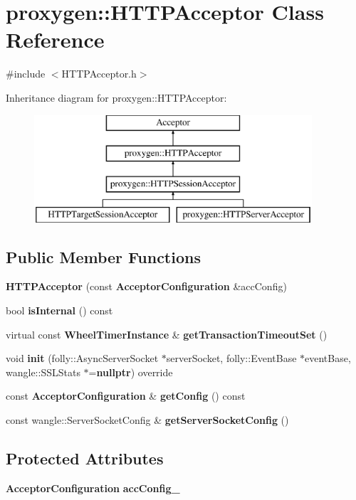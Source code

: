 \section{proxygen\+:\+:H\+T\+T\+P\+Acceptor Class Reference}
\label{classproxygen_1_1HTTPAcceptor}


{\ttfamily \#include $<$H\+T\+T\+P\+Acceptor.\+h$>$}

Inheritance diagram for proxygen\+:\+:H\+T\+T\+P\+Acceptor\+:\begin{figure}[H]
\begin{center}
\leavevmode
\includegraphics[height=4.000000cm]{classproxygen_1_1HTTPAcceptor}
\end{center}
\end{figure}
\subsection*{Public Member Functions}
\begin{DoxyCompactItemize}
\item 
{\bf H\+T\+T\+P\+Acceptor} (const {\bf Acceptor\+Configuration} \&acc\+Config)
\item 
bool {\bf is\+Internal} () const 
\item 
virtual const {\bf Wheel\+Timer\+Instance} \& {\bf get\+Transaction\+Timeout\+Set} ()
\item 
void {\bf init} (folly\+::\+Async\+Server\+Socket $\ast$server\+Socket, folly\+::\+Event\+Base $\ast$event\+Base, wangle\+::\+S\+S\+L\+Stats $\ast$={\bf nullptr}) override
\item 
const {\bf Acceptor\+Configuration} \& {\bf get\+Config} () const 
\item 
const wangle\+::\+Server\+Socket\+Config \& {\bf get\+Server\+Socket\+Config} ()
\end{DoxyCompactItemize}
\subsection*{Protected Attributes}
\begin{DoxyCompactItemize}
\item 
{\bf Acceptor\+Configuration} {\bf acc\+Config\+\_\+}
\end{DoxyCompactItemize}
